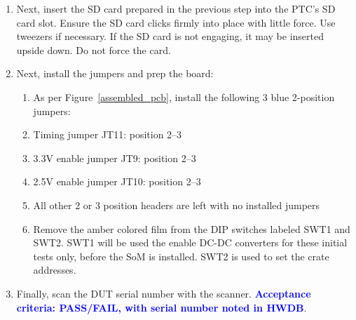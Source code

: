 \documentclass[a4paper,12pt]{article}
\begin{document}
\begin{enumerate}
            \begin{enumerate}
                \item There will be a standard reference image for the firmware. The image consists of 4 files, explained below.
                \item Ensure that the networking-stack package is enabled for later ethernet testing
                \item Format the SD card by using \texttt{sudo gparted} to create two partitions on an SDHC micro-SD card: a 256MB FAT32 partition named BOOT, and the remainder of the disk should be an EXT4 partition called ROOT.
                \item Copy the following files to the BOOT partition: BOOT.bin, image.ub, boot.scr. These files load the FPGA image, and start the initial Linux boos.
                \item Copy the file rootfs.tar.gz to the ROOT partition. Then \texttt{gunzip} and \texttt{tar -xvf} the file to uncompress the entire contents. This is the root filesystem.
            \end{enumerate}
        \item Next, insert the SD card prepared in the previous step into the PTC's SD card slot. Ensure the SD card clicks firmly into place with little force. Use tweezers if necessary. If the SD card is not engaging, it may be inserted upside down. Do not force the card.
        \item Next, install the jumpers and prep the board:
            \begin{enumerate}
                \item As per Figure~\ref{assembled_pcb}, install the following 3 blue 2-position jumpers:
                \item Timing jumper JT11: position 2--3
                \item 3.3V enable jumper JT9: position 2--3
                \item 2.5V enable jumper JT10: position 2--3
                \item All other 2 or 3 position headers are left with no installed jumpers
                \item Remove the amber colored film from the DIP switches labeled SWT1 and SWT2. SWT1 will be used the enable DC-DC converters for these initial tests only, before the SoM is installed. SWT2 is used to set the crate addresses.
            \end{enumerate}
        \item Finally, scan the DUT serial number with the scanner.  \textcolor{blue}{\textbf{Acceptance criteria: PASS/FAIL, with serial number noted in HWDB}}.
    \end{enumerate}
\end{document}
